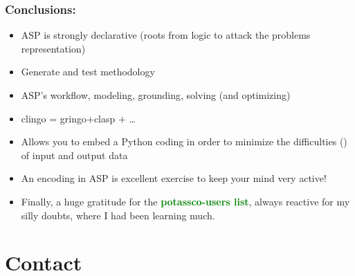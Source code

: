 \documentclass{beamer}
\begin{document}

\begin{frame}[fragile] 
	\frametitle{Conclusions:}
	
\begin{block}{}
\begin{itemize}
  

  \item ASP is strongly declarative (roots from logic to attack the problems representation)
  
  \item Generate and test methodology
    
  \item ASP's workflow, modeling, grounding, solving
    (and optimizing)
  \item clingo = gringo$+$clasp $+$ \dots

  \item Allows you to embed a Python coding in order to minimize the difficulties (\Frowny) of input and output data
		
   \item An encoding in ASP is excellent exercise to keep your mind very active!

	\item Finally, a huge gratitude for the \textcolor{green}{\textbf{potassco-users list}}, always reactive for my silly doubts,  where I had been learning much.
		
	\end{itemize}
\end{block}
\end{frame}



\section*{Contact}
\end{document}
